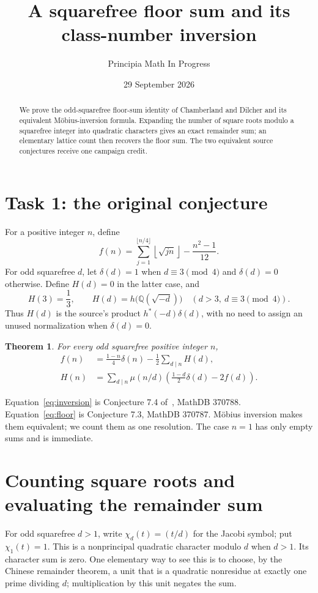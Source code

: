 \documentclass[11pt]{article}
\title{A squarefree floor sum and its class-number inversion}
\author{Principia Math In Progress}
\date{29 September 2026}
\newtheorem{theorem}{Theorem}
\newcommand{\fl}[1]{\left\lfloor#1\right\rfloor}
\begin{document}
\maketitle
\begin{abstract}
We prove the odd-squarefree floor-sum identity of Chamberland and Dilcher
and its equivalent M\"obius-inversion formula. Expanding the number of
square roots modulo a squarefree integer into quadratic characters gives
an exact remainder sum; an elementary lattice count then recovers the
floor sum. The two equivalent source conjectures receive one campaign credit.
\end{abstract}

\section*{Task 1: the original conjecture}
For a positive integer $n$, define
\[
 f(n)=\sum_{j=1}^{\lfloor n/4\rfloor}\fl{\sqrt{jn}}-\frac{n^2-1}{12}.
\]
For odd squarefree $d$, let $\delta(d)=1$ when $d\equiv3\pmod4$ and
$\delta(d)=0$ otherwise. Define $H(d)=0$ in the latter case, and
\[
 H(3)=\frac13,\qquad
 H(d)=h\bigl(\mathbb Q(\sqrt{-d})\bigr)
       \quad(d>3,\ d\equiv3\pmod4).
\]
Thus $H(d)$ is the source's product $h^*(-d)\delta(d)$, with no need
to assign an unused normalization when $\delta(d)=0$.

\begin{theorem}\label{thm:main}
For every odd squarefree positive integer $n$,
\begin{align}
 f(n)&=\frac{1-n}{4}\delta(n)-\frac12\sum_{d\mid n}H(d),
 \label{eq:floor}\\
 H(n)&=\sum_{d\mid n}\mu(n/d)
       \left(\frac{1-d}{2}\delta(d)-2f(d)\right).
 \label{eq:inversion}
\end{align}
\end{theorem}
Equation~\eqref{eq:inversion} is Conjecture 7.4 of~\cite[p.~22]{CD},
MathDB 370788. Equation~\eqref{eq:floor} is Conjecture 7.3,
MathDB 370787. M\"obius inversion makes them equivalent; we count them
as one resolution. The case $n=1$ has only empty sums and is immediate.

\section*{Counting square roots and evaluating the remainder sum}
For odd squarefree $d>1$, write $\chi_d(t)=(t/d)$ for the Jacobi symbol;
put $\chi_1(t)=1$. This is a nonprincipal quadratic character modulo $d$
when $d>1$. Its character sum is zero. One elementary way to see this is
to choose, by the Chinese remainder theorem, a unit that is a quadratic
nonresidue at exactly one prime dividing $d$; multiplication by this
unit negates the sum.
\end{document}
